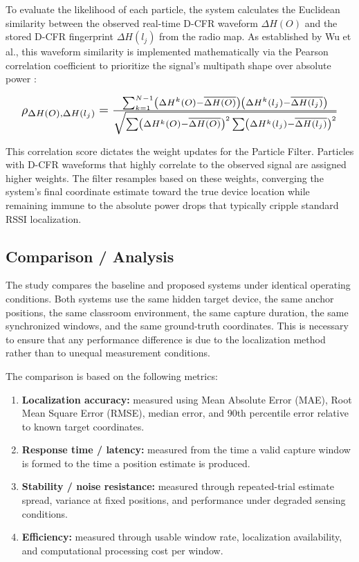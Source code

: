 To evaluate the likelihood of each particle, the system calculates the Euclidean similarity between the observed real-time D-CFR waveform $\Delta H(O)$ and the stored D-CFR fingerprint $\Delta H(l_j)$ from the radio map. As established by Wu et al., this waveform similarity is implemented mathematically via the Pearson correlation coefficient to prioritize the signal's multipath shape over absolute power \cite{wu2012csi}:

\begin{equation}
\label{eq:pearson}
\resizebox{0.95\columnwidth}{!}{$
    \rho_{\Delta H(O),\Delta H(l_j)} = \frac{\sum_{k=1}^{N-1} \left( \Delta H^k(O) - \overline{\Delta H(O)} \right) \left( \Delta H^k(l_j) - \overline{\Delta H(l_j)} \right)}{\sqrt{\sum \left( \Delta H^k(O) - \overline{\Delta H(O)} \right)^2 \sum \left( \Delta H^k(l_j) - \overline{\Delta H(l_j)} \right)^2}}
$}
\end{equation}

This correlation score dictates the weight updates for the Particle Filter. Particles with D-CFR waveforms that highly correlate to the observed signal are assigned higher weights. The filter resamples based on these weights, converging the system's final coordinate estimate toward the true device location while remaining immune to the absolute power drops that typically cripple standard RSSI localization.

\subsection{Comparison / Analysis}

The study compares the baseline and proposed systems under identical operating conditions. Both systems use the same hidden target device, the same anchor positions, the same classroom environment, the same capture duration, the same synchronized windows, and the same ground-truth coordinates. This is necessary to ensure that any performance difference is due to the localization method rather than to unequal measurement conditions.

The comparison is based on the following metrics:

\begin{enumerate}
    \item \textbf{Localization accuracy:} measured using Mean Absolute Error (MAE), Root Mean Square Error (RMSE), median error, and 90th percentile error relative to known target coordinates.
    \item \textbf{Response time / latency:} measured from the time a valid capture window is formed to the time a position estimate is produced.
    \item \textbf{Stability / noise resistance:} measured through repeated-trial estimate spread, variance at fixed positions, and performance under degraded sensing conditions.
    \item \textbf{Efficiency:} measured through usable window rate, localization availability, and computational processing cost per window.
\end{enumerate}

